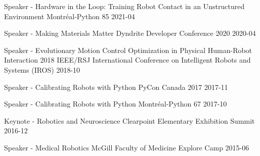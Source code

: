 \begin{cvhonors}

\cvhonor
{Speaker - Hardware in the Loop: Training Robot Contact in an Unstructured Environment}
{Montréal-Python 85}
{}
{2021-04}

\cvhonor
{Speaker - Making Materials Matter}
{Dyndrite Developer Conference 2020}
{}
{2020-04}

\cvhonor
{Speaker - Evolutionary Motion Control Optimization in Physical Human-Robot Interaction}
{2018 IEEE/RSJ International Conference on Intelligent Robots and Systems (IROS)}
{}
{2018-10}

\cvhonor
{Speaker - Calibrating Robots with Python}
{PyCon Canada 2017}
{}
{2017-11}

\cvhonor
{Speaker - Calibrating Robots with Python}
{Montréal-Python 67}
{}
{2017-10}

\cvhonor
{Keynote - Robotics and Neuroscience}
{Clearpoint Elementary Exhibition Summit}
{}
{2016-12}

\cvhonor
{Speaker - Medical Robotics}
{McGill Faculty of Medicine Explore Camp}
{}
{2015-06}




\end{cvhonors}
